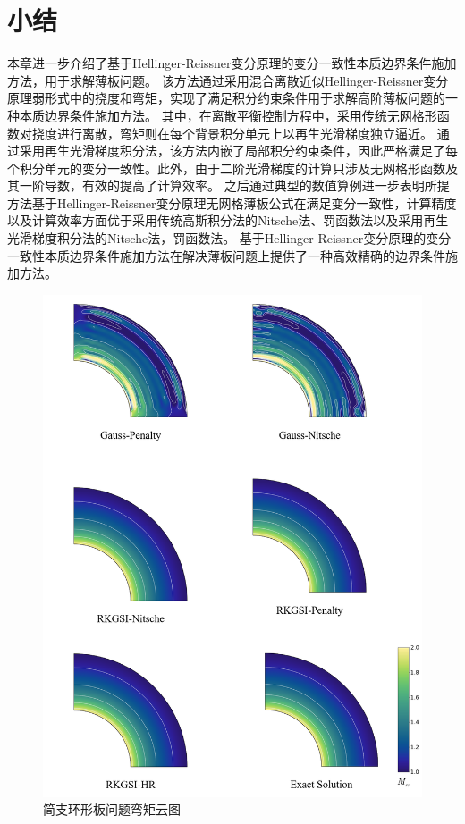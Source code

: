 \section{小结}
本章进一步介绍了基于Hellinger-Reissner变分原理的变分一致性本质边界条件施加方法，用于求解薄板问题。
该方法通过采用混合离散近似Hellinger-Reissner变分原理弱形式中的挠度和弯矩，实现了满足积分约束条件用于求解高阶薄板问题的一种本质边界条件施加方法。
其中，在离散平衡控制方程中，采用传统无网格形函数对挠度进行离散，弯矩则在每个背景积分单元上以再生光滑梯度独立逼近。
通过采用再生光滑梯度积分法，该方法内嵌了局部积分约束条件，因此严格满足了每个积分单元的变分一致性。此外，由于二阶光滑梯度的计算只涉及无网格形函数及其一阶导数，有效的提高了计算效率。 
之后通过典型的数值算例进一步表明所提方法基于Hellinger-Reissner变分原理无网格薄板公式在满足变分一致性，计算精度以及计算效率方面优于采用传统高斯积分法的Nitsche法、罚函数法以及采用再生光滑梯度积分法的Nitsche法，罚函数法。
基于Hellinger-Reissner变分原理的变分一致性本质边界条件施加方法在解决薄板问题上提供了一种高效精确的边界条件施加方法。
\newpage
\begin{figure}[H]
    \centering
    \includegraphics[scale=0.5]{figure/PHR/A/Mxy.png}
    \caption{简支环形板问题弯矩云图}\label{AMxy}
\end{figure}
